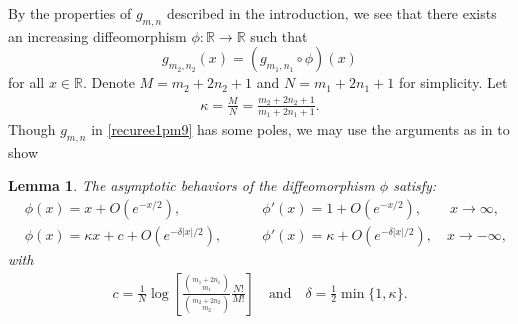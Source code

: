 \documentclass[12pt]{amsart}
\numberwithin{equation}{section}
\newtheorem{lemma}[theorem]{Lemma}
\begin{document}
By the properties of $g_{m,n}$ described in the introduction, we see that there exists an increasing diffeomorphism $\phi: \mathbb{R}\to \mathbb{R}$ such that
\begin{equation}\label{recuree-1orqr-1}
g_{m_2,n_2}(x)=(g_{m_1,n_1}\circ\phi)(x)
\end{equation}
for all $x\in \mathbb{R}$. Denote $M=m_2+2n_2+1$ and $N=m_1+2n_1+1$ for simplicity. Let
\begin{equation*}%
\begin{split}
\kappa=\frac{M}{N}=\frac{m_2+2n_2+1}{m_1+2n_1+1}.
\end{split}
\end{equation*}
Though $g_{m,n}$ in \eqref{recuree1pm9} has some poles, we may use the arguments as in \cite{Bergweilereremenko2017} to show

\begin{lemma}\label{Lemma 0}
The asymptotic behaviors of the diffeomorphism $\phi$ satisfy:
\begin{eqnarray}
&\phi(x)=x+O(e^{-x/2}),        \quad\quad\quad\quad\quad &\phi'(x)=1+O(e^{-x/2}), \quad\quad x\to \infty,  \label{recuree1pm11}\\
&\phi(x)=\kappa x+c+O(e^{-\delta|x|/2}),    \quad\quad &\phi'(x)=\kappa+O(e^{-\delta|x|/2}),  \quad x\to -\infty,             \label{recuree1pm12}
\end{eqnarray}
with
\begin{equation*}%
\begin{split}
c=\frac{1}{N}\log \left[\frac{\binom{m_1+2n_1}{m_1}}{\binom{m_2+2n_2}{m_2}}\frac{N!}{M!}\right] \quad \text{and} \quad \delta=\frac{1}{2}\min\{1,\kappa\}.
\end{split}
\end{equation*}

\end{lemma}
\end{document}
